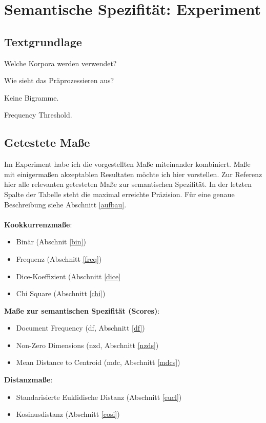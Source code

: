\documentclass[11pt,numbers=noenddot]{scrartcl}
\begin{document}
\section{Semantische Spezifität: Experiment}

\subsection{Textgrundlage}

Welche Korpora werden verwendet?

Wie sieht das Präprozessieren aus?

Keine Bigramme.

Frequency Threshold.
\subsection{Getestete Maße}

Im Experiment habe ich die vorgestellten Maße miteinander kombiniert. Maße mit einigermaßen akzeptablen Resultaten möchte ich hier vorstellen. Zur Referenz hier alle relevanten getesteten Maße zur semantischen Spezifität. In der letzten Spalte der Tabelle steht die maximal erreichte Präzision. Für eine genaue Beschreibung siehe Abschnitt \ref{aufbau}.
\\\\
\textbf{Kookkurrenzmaße}:
\begin{itemize}
    \item Binär (Abschnit \ref{bin})
    \item Frequenz (Abschnitt \ref{freq})
    \item Dice-Koeffizient (Abschnitt \ref{dice}
    \item Chi Square (Abschnitt \ref{chi})
\end{itemize}

\textbf{Maße zur semantischen Spezifität (Scores)}:
\begin{itemize}
    \item Document Frequency (df, Abschnitt \ref{df})
    \item Non-Zero Dimensions (nzd, Abschnitt \ref{nzds})
    \item Mean Distance to Centroid (mdc, Abschnitt \ref{mdcs})
\end{itemize}

\textbf{Distanzmaße}:
\begin{itemize}
    \item Standarisierte Euklidische Distanz  (Abschnitt \ref{eucl})
    \item Kosinusdistanz (Abschnitt \ref{cosi})
\end{itemize}
\end{document}
